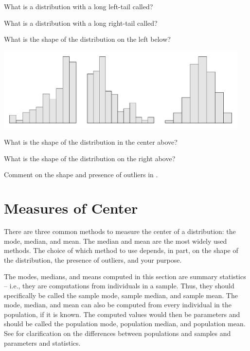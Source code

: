 \documentclass[10pt,openany]{book}\usepackage[]{graphicx}\usepackage[]{color}
\begin{document}
\vspace{24pt}
\begin{exsection}
  \item \label{revex:quEDALSkew} What is a distribution with a long left-tail called? 
  \item \label{revex:quEDARSkew} What is a distribution with a long right-tail called? 
  \item \label{revex:quEDALSkewg} What is the shape of the distribution on the left below? 


\begin{center}
  \includegraphics[width=5in]{Figs/HistQuest-1}
\end{center}
  \item \label{revex:quEDASymg} What is the shape of the distribution in the center above? 
  \item \label{revex:quEDARSkewg} What is the shape of the distribution on the right above? 
  \item \label{revex:quEDAlead} Comment on the shape and presence of outliers in . 
\end{exsection}


\section{Measures of Center} \label{sec:quEDACenter}
There are three common methods to measure the center of a distribution: the mode, median, and mean.  The median and mean are the most widely used methods.  The choice of which method to use depends, in part, on the shape of the distribution, the presence of outliers, and your purpose.

The modes, medians, and means computed in this section are summary statistics -- i.e., they are computations from individuals in a sample.  Thus, they should specifically be called the sample mode, sample median, and sample mean.  The mode, median, and mean can also be computed from every individual in the population, if it is known.  The computed values would then be parameters and should be called the population mode, population median, and population mean.  See  for clarification on the differences between populations and samples and parameters and statistics.
\end{document}
